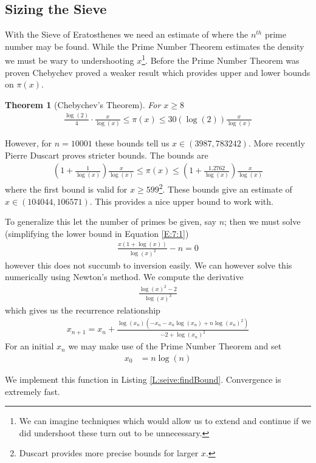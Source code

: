 \documentclass[oneside,12pt]{book}   	%
\newcounter{ex}
\newcounter{pr}
\newtheorem{thm}{Theorem}[chapter]
\theoremstyle{definition}
\begin{document}
\begin{spacing}{1.618}
			
		
		\section{Sizing the Sieve}
			With the Sieve of Eratosthenes we need an estimate of where the $n^{th}$ prime number may be found. While the Prime Number Theorem estimates the density we must be wary to undershooting $x$\footnote{We can imagine techniques which would allow us to extend and continue if we did undershoot these turn out to be unnecessary.}. Before the Prime Number Theorem was proven Chebychev proved a weaker result which provides upper and lower bounds on $\pi(x)$. 
			\begin{thm}[Chebychev's Theorem]\label{T:7:1}
				For $x\geq 8$
				\begin{alignat}{4}
					\frac{\log{(2)}}{4}\cdot \frac{x}{\log{(x)}} \leq \pi(x) \leq 30(\log{(2)})\frac{x}{\log{(x)}}
				\end{alignat}
			\end{thm}
			However, for $n=10001$ these bounds tell us $x\in(3987, 783242)$. More recently Pierre Duscart proves stricter bounds\cite{Duscart1998}. The bounds are
			\begin{alignat}{4}
				\left(1+\frac{1}{\log{(x)}}\right)\frac{x}{\log{(x)}} \leq \pi(x)\leq\left(1+\frac{1.2762}{\log{(x)}}\right)\frac{x}{\log{(x)}} \label{E:7:1}
			\end{alignat}
			where the first bound is valid for $x\geq 599$\footnote{Duscart provides more precise bounds for larger $x$.}. These bounds give an estimate of $x\in(104044, 106571)$. This provides a nice upper bound to work with. 
			
			To generalize this let the number of primes be given, say $n$; then we must solve (simplifying the lower bound in Equation \ref{E:7:1})
			\begin{alignat}{4}
				\frac{x(1+\log{(x)})}{\log{(x)}^2}-n=0
			\end{alignat}
			however this does not succumb to inversion easily. We can however solve this numerically using Newton's method. We compute the derivative
			\begin{alignat}{4}
				\frac{\log{(x)}^2-2}{\log{(x)}^3}
			\end{alignat}
			which gives us the recurrence relationship 
			\begin{alignat}{4}
				x_{n+1}=x_n+\frac{\log{(x_n)}\left(-x_n-x_n\log{(x_n)}+n\log{(x_n)}^2\right)}{-2+\log{(x_n)}^2}
			\end{alignat}
			For an initial $x_n$ we may make use of the Prime Number Theorem and set 
			\begin{alignat}{4}
				x_0&=n\log{(n)}
			\end{alignat}
			
			We implement this function in Listing \ref{L:seive:findBound}. Convergence is extremely fast.  
			

\end{spacing}
\end{document}
